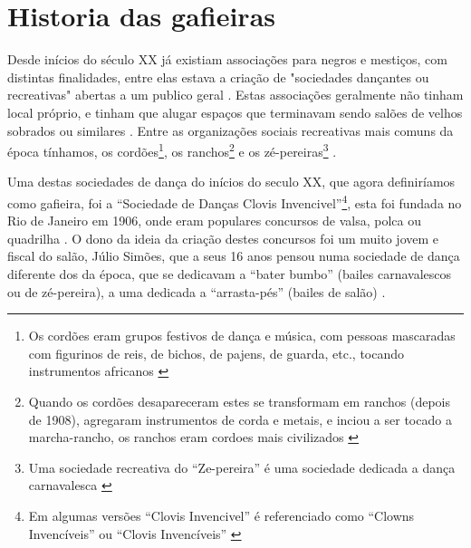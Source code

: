 

\chapter{Historia das gafieiras}

Desde inícios do século XX já existiam associações para negros e mestiços, 
com distintas  finalidades, entre elas estava a criação de 
"sociedades dançantes ou recreativas" abertas a um publico geral
\cite[pp. 154-155]{neres1999negro} \cite[pp. 71]{de2008bexiga} \cite[pp. 11]{respeitojournalbrasil1}.
Estas associações geralmente não tinham local próprio, 
e tinham que alugar espaços que terminavam sendo salões de velhos sobrados
ou similares \cite[pp. 154-155]{neres1999negro} \cite[pp. 49]{diniz2003almanaque}.
Entre as organizações sociais recreativas mais comuns da época tínhamos, 
os cordões\footnote{Os cordões eram grupos festivos de dança e música, 
com pessoas mascaradas com figurinos de reis, de
bichos, de pajens, de guarda, etc., tocando instrumentos africanos \cite[pp. 23-24]{fernandes2001escolas}},
os ranchos\footnote{Quando os cordões desapareceram estes se transformam em ranchos (depois de 1908), 
agregaram instrumentos de corda e metais, e inciou a ser tocado a marcha-rancho,
os ranchos eram cordoes mais civilizados \cite[pp. 24]{fernandes2001escolas}} 
e os zé-pereiras\footnote{ Uma sociedade recreativa do ``Ze-pereira''
é uma sociedade dedicada a dança carnavalesca \cite[pp. 10]{simoesjournalbrasil1}} 
\cite[pp. 10]{simoesjournalbrasil1}.


Uma destas sociedades de dança do inícios do seculo XX, que agora definiríamos como gafieira, 
foi a ``Sociedade de Danças Clovis Invencivel''\footnote{Em algumas versões 
``Clovis Invencivel'' é referenciado como ``Clowns Invencíveis'' \cite[pp. 3]{juliosimoes} ou 
``Clovis Invencíveis'' \cite[pp. 10]{simoesjournalbrasil1}}, 
esta foi fundada no Rio de Janeiro em 1906, 
onde eram populares concursos de valsa, polca ou quadrilha \cite[pp. 6 - cad. B]{entrevistajuliojournalbrasil1}.
O dono da ideia da criação destes concursos foi um muito jovem e fiscal do salão, Júlio Simões,
que a seus 16 anos pensou numa sociedade de dança diferente dos da época,
que se dedicavam a ``bater bumbo'' (bailes carnavalescos ou de zé-pereira), 
a uma dedicada a ``arrasta-pés'' (bailes de salão) \cite[pp. 6 - cad. B]{entrevistajuliojournalbrasil1} \cite[pp. 3]{juliosimoes} \cite[pp. 10]{simoesjournalbrasil1}.

